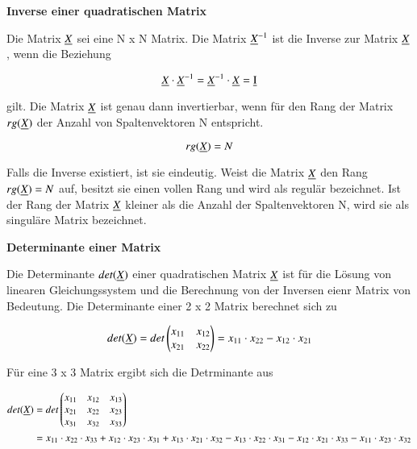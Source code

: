 \clearpage

\selectfont
\noindent\textbf{Inverse einer quadratischen Matrix}\smallskip

\noindent Die Matrix $\underline{X}$ sei eine N x N Matrix. Die Matrix $\underline{X}^{-1}$ ist die Inverse zur Matrix $\underline{X}$, wenn die Beziehung

\begin{equation}\label{eq:fifteeneighteen}
\underline{X}\cdot\underline{X}^{-1}=\underline{X}^{-1}\cdot\underline{X}=\underbar{I}
\end{equation}

\noindent gilt. Die Matrix $\underline{X}$ ist genau dann invertierbar, wenn f\"{u}r den Rang der Matrix $rg(\underline{X})$ der Anzahl von Spaltenvektoren N entspricht.

\begin{equation}\label{eq:fifteennineteen}
rg(\underline{X})=N
\end{equation}

\noindent Falls die Inverse existiert, ist sie eindeutig. Weist die Matrix $\underline{X}$ den Rang $rg(\underline{X}) = N$ auf, besitzt sie einen vollen Rang und wird als regul\"{a}r bezeichnet. Ist der Rang der Matrix $\underline{X}$ kleiner als die Anzahl der Spaltenvektoren N, wird sie als singul\"{a}re Matrix bezeichnet.\bigskip

\selectfont
\noindent\textbf{Determinante einer Matrix}\smallskip

\noindent Die Determinante $det(\underline{X})$ einer quadratischen Matrix $\underline{X}$ ist f\"{u}r die L\"{o}sung von linearen Gleichungssystem und die Berechnung von der Inversen eienr Matrix von Bedeutung. Die Determinante einer 2 x 2 Matrix berechnet sich zu

\begin{equation}\label{eq:fifteentwenty}
det(\underline{X})=det
\begin{pmatrix}
x_{11} & x_{12}\\
x_{21} & x_{22}\\
\end{pmatrix} =
x_{11} \cdot x_{22}-x_{12} \cdot x_{21}
\end{equation}

\noindent F\"{u}r eine 3 x 3 Matrix ergibt sich die Detrminante aus

\begin{equation}\label{eq:fifteentwentyone}
\begin{split}
det(\underline{X}) & =det
\begin{pmatrix}
x_{11} & x_{12} & x_{13}\\
x_{21} & x_{22} & x_{23}\\
x_{31} & x_{32} & x_{33}\\
\end{pmatrix}\\
&=
x_{11}\cdot x_{22}\cdot x_{33}+x_{12}\cdot x_{23}\cdot x_{31}+x_{13}\cdot x_{21}\cdot x_{32}-x_{13}\cdot x_{22}\cdot x_{31}-x_{12}\cdot x_{21}\cdot x_{33}-x_{11}\cdot x_{23}\cdot x_{32}
\end{split}
\end{equation}

